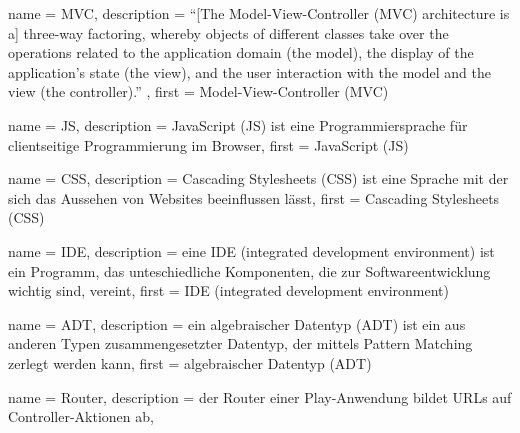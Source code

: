 






{
  name        = MVC,
  description = {"`[The Model-View-Controller (MVC) architecture is a] three-way factoring, whereby objects of different classes take over the operations related to the application domain (the model), the display of the application's state (the view), and the user interaction with the model and the view (the controller)."' \cite[vgl.][S.~1]{mvc}},
  first       = {Model-View-Controller (MVC)}
}


{
  name        = JS,
  description = {JavaScript (JS) ist eine Programmiersprache für clientseitige Programmierung im Browser},
  first       = {JavaScript (JS)}
}


{
  name        = CSS,
  description = {Cascading Stylesheets (CSS) ist eine Sprache mit der sich das Aussehen von Websites beeinflussen lässt},
  first       = {Cascading Stylesheets (CSS)}
}


{
  name        = IDE,
  description = {eine IDE (integrated development environment) ist ein Programm, das unteschiedliche Komponenten, die zur Softwareentwicklung wichtig sind, vereint},
  first       = {IDE (integrated development environment)}
}


{
  name        = ADT,
  description = {ein algebraischer Datentyp (ADT) ist ein aus anderen Typen zusammengesetzter Datentyp, der mittels Pattern Matching zerlegt werden kann},
  first       = {algebraischer Datentyp (ADT)}
}


{
  name        = Router,
  description = {der Router einer Play-Anwendung bildet URLs auf Controller-Aktionen ab},
}